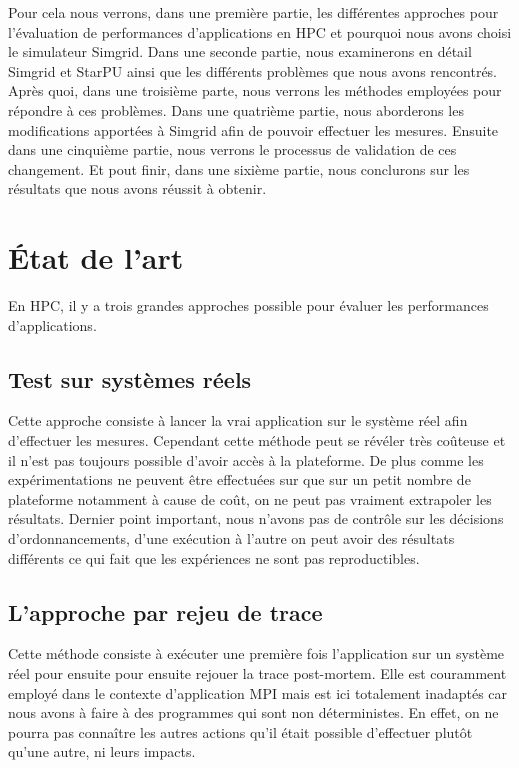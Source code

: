 \documentclass[smallextended]{svjour3}
\begin{document}
Pour cela nous verrons, dans une première partie, les différentes
approches pour l'évaluation de performances d'applications en HPC et
pourquoi nous avons choisi le simulateur Simgrid. Dans une seconde
partie, nous examinerons en détail Simgrid et StarPU ainsi que les
différents problèmes que nous avons rencontrés. Après quoi, dans une
troisième parte, nous verrons les méthodes employées pour répondre à
ces problèmes. Dans une quatrième partie, nous aborderons les
modifications apportées à Simgrid afin de pouvoir effectuer les
mesures. Ensuite dans une cinquième partie, nous verrons le
processus de validation de ces changement. Et pout finir, dans une
sixième partie, nous conclurons sur les résultats que nous avons
réussit à obtenir. 

\section{État de l'art}
\label{sec-2}
En HPC, il y a trois grandes approches possible pour évaluer les
performances d'applications.
\subsection{Test sur systèmes réels}
\label{sec-2-1}
Cette approche consiste à lancer la vrai application sur le système
réel afin d'effectuer les mesures. Cependant cette méthode peut se 
révéler très coûteuse et il n'est pas toujours possible d'avoir
accès à la plateforme. De plus comme les expérimentations ne
peuvent être effectuées sur que sur un petit nombre de plateforme
notamment à cause de coût, on ne peut pas vraiment extrapoler les
résultats. Dernier point important, nous n'avons pas de contrôle
sur les décisions d'ordonnancements, d'une exécution à l'autre on
peut avoir des résultats différents ce qui fait que les
expériences ne sont pas reproductibles. 
\subsection{L'approche par rejeu de trace}
\label{sec-2-2}
Cette méthode consiste à exécuter une première fois l'application
sur un système réel pour ensuite pour ensuite rejouer la trace
post-mortem. Elle est couramment employé dans le contexte 
d'application MPI mais est ici totalement inadaptés car nous avons
à faire à des programmes qui sont non déterministes. En effet, on ne
pourra pas connaître les autres actions qu'il était possible
d'effectuer plutôt qu'une autre, ni leurs impacts.
\end{document}
